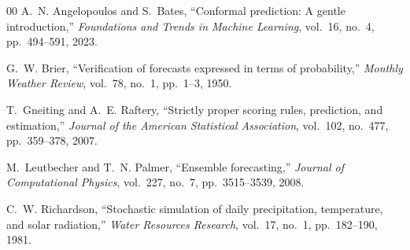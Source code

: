 \documentclass[conference]{IEEEtran}
\begin{document}
\begin{thebibliography}{00}
A.~N. Angelopoulos and S.~Bates, ``Conformal prediction: A gentle introduction,''
\emph{Foundations and Trends in Machine Learning}, vol.~16, no.~4, pp.~494--591, 2023.

G.~W. Brier, ``Verification of forecasts expressed in terms of probability,''
\emph{Monthly Weather Review}, vol.~78, no.~1, pp.~1--3, 1950.

T.~Gneiting and A.~E. Raftery, ``Strictly proper scoring rules, prediction, and estimation,''
\emph{Journal of the American Statistical Association}, vol.~102, no.~477, pp.~359--378, 2007.

M.~Leutbecher and T.~N. Palmer, ``Ensemble forecasting,'' \emph{Journal of Computational Physics},
vol.~227, no.~7, pp.~3515--3539, 2008.

C.~W. Richardson, ``Stochastic simulation of daily precipitation, temperature, and solar
radiation,'' \emph{Water Resources Research}, vol.~17, no.~1, pp.~182--190, 1981.

\end{thebibliography}
\end{document}
